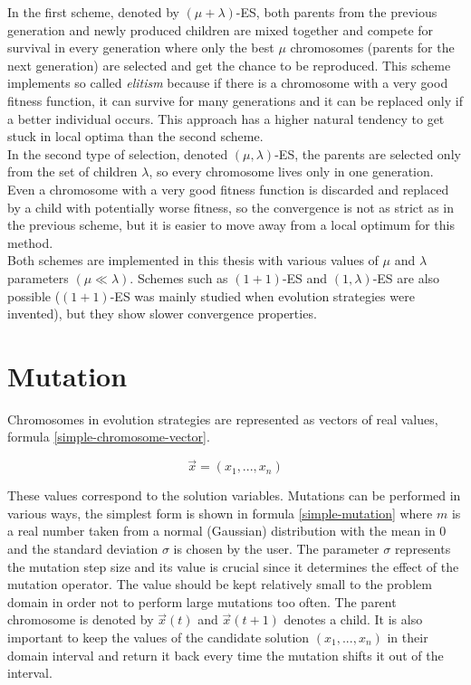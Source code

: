 In the first scheme, denoted by $(\mu + \lambda)$-ES, both parents from the previous generation and newly produced children are mixed together and compete for survival in every generation where only the best $\mu$ chromosomes (parents for the next generation) are selected and get the chance to be reproduced. This scheme implements so called \textit{elitism} because if there is a chromosome with a very good fitness function, it can survive for many generations and it can be replaced only if a better individual occurs. This approach has a higher natural tendency to get stuck in local optima than the second scheme.\\
In the second type of selection, denoted $(\mu,\lambda)$-ES, the parents are selected only from the set of children $\lambda$, so every chromosome lives only in one generation. Even a chromosome with a very good fitness function is discarded and replaced by a child with potentially worse fitness, so the convergence is not as strict as in the previous scheme, but it is easier to move away from a local optimum for this method.\\
Both schemes are implemented in this thesis with various values of $\mu$ and $\lambda$ parameters $(\mu \ll \lambda)$. Schemes such as $(1 + 1)$-ES and $(1, \lambda)$-ES are also possible ($(1 + 1)$-ES was mainly studied when evolution strategies were invented), but they show slower convergence properties.

\section{Mutation} \label{mutation-section}
Chromosomes in evolution strategies are represented as vectors of real values, formula \ref{simple-chromosome-vector}.

\begin{equation} \label{simple-chromosome-vector}
\vec{x} = (x_1,...,x_n)
 \end{equation}

 These values correspond to the solution variables. Mutations can be performed in various ways, the simplest form is shown in formula \ref{simple-mutation} where $m$ is a real number taken from a normal (Gaussian) distribution with the mean in $0$ and the standard deviation $\sigma$ is chosen by the user. The parameter $\sigma$ represents the mutation step size and its value is crucial since it determines the effect of the mutation operator. The value should be kept relatively small to the problem domain in order not to perform large mutations too often. The parent chromosome is denoted by $\vec{x}(t)$ and $\vec{x}(t+1)$ denotes a child. It is also important to keep the values of the candidate solution $(x_1,...,x_n)$ in their domain interval and return it back every time the mutation shifts it out of the interval.

